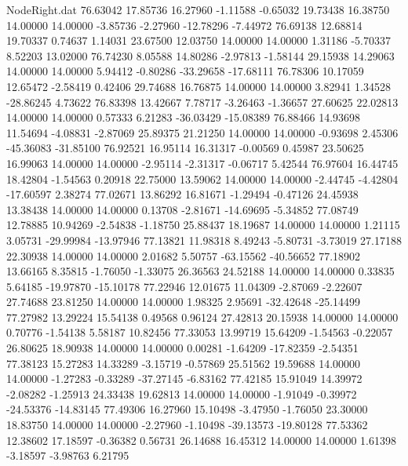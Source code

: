 \begin{filecontents}{NodeRight.dat}
  76.63042   17.85736   16.27960    -1.11588   -0.65032   19.73438   16.38750   14.00000   14.00000   -3.85736   -2.27960  -12.78296   -7.44972
  76.69138   12.68814   19.70337     0.74637    1.14031   23.67500   12.03750   14.00000   14.00000    1.31186   -5.70337    8.52203   13.02000
  76.74230    8.05588   14.80286    -2.97813   -1.58144   29.15938   14.29063   14.00000   14.00000    5.94412   -0.80286  -33.29658  -17.68111
  76.78306   10.17059   12.65472    -2.58419    0.42406   29.74688   16.76875   14.00000   14.00000    3.82941    1.34528  -28.86245    4.73622
  76.83398   13.42667    7.78717    -3.26463   -1.36657   27.60625   22.02813   14.00000   14.00000    0.57333    6.21283  -36.03429  -15.08389
  76.88466   14.93698   11.54694    -4.08831   -2.87069   25.89375   21.21250   14.00000   14.00000   -0.93698    2.45306  -45.36083  -31.85100
  76.92521   16.95114   16.31317    -0.00569    0.45987   23.50625   16.99063   14.00000   14.00000   -2.95114   -2.31317   -0.06717    5.42544
  76.97604   16.44745   18.42804    -1.54563    0.20918   22.75000   13.59062   14.00000   14.00000   -2.44745   -4.42804  -17.60597    2.38274
  77.02671   13.86292   16.81671    -1.29494   -0.47126   24.45938   13.38438   14.00000   14.00000    0.13708   -2.81671  -14.69695   -5.34852
  77.08749   12.78885   10.94269    -2.54838   -1.18750   25.88437   18.19687   14.00000   14.00000    1.21115    3.05731  -29.99984  -13.97946
  77.13821   11.98318    8.49243    -5.80731   -3.73019   27.17188   22.30938   14.00000   14.00000    2.01682    5.50757  -63.15562  -40.56652
  77.18902   13.66165    8.35815    -1.76050   -1.33075   26.36563   24.52188   14.00000   14.00000    0.33835    5.64185  -19.97870  -15.10178
  77.22946   12.01675   11.04309    -2.87069   -2.22607   27.74688   23.81250   14.00000   14.00000    1.98325    2.95691  -32.42648  -25.14499
  77.27982   13.29224   15.54138     0.49568    0.96124   27.42813   20.15938   14.00000   14.00000    0.70776   -1.54138    5.58187   10.82456
  77.33053   13.99719   15.64209    -1.54563   -0.22057   26.80625   18.90938   14.00000   14.00000    0.00281   -1.64209  -17.82359   -2.54351
  77.38123   15.27283   14.33289    -3.15719   -0.57869   25.51562   19.59688   14.00000   14.00000   -1.27283   -0.33289  -37.27145   -6.83162
  77.42185   15.91049   14.39972    -2.08282   -1.25913   24.33438   19.62813   14.00000   14.00000   -1.91049   -0.39972  -24.53376  -14.83145
  77.49306   16.27960   15.10498    -3.47950   -1.76050   23.30000   18.83750   14.00000   14.00000   -2.27960   -1.10498  -39.13573  -19.80128
  77.53362   12.38602   17.18597    -0.36382    0.56731   26.14688   16.45312   14.00000   14.00000    1.61398   -3.18597   -3.98763    6.21795

\end{filecontents}
